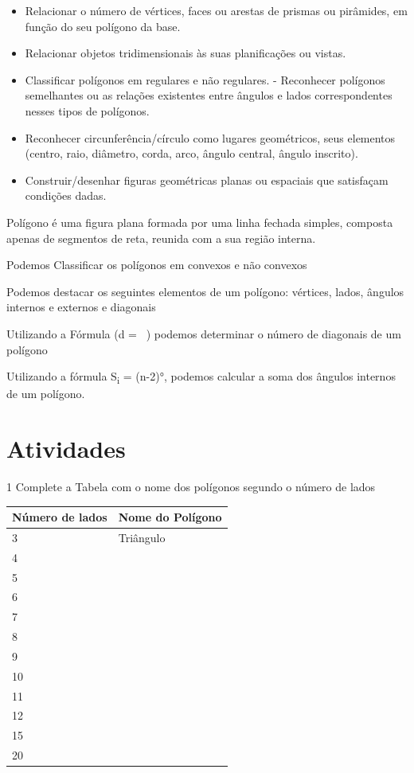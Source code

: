 \begin{itemize}

\item 
  Relacionar o número de vértices, faces ou arestas de prismas ou
  pirâmides, em função do seu polígono da base.

\item 
  Relacionar objetos tridimensionais às suas planificações ou vistas.

\item 
  Classificar polígonos em regulares e não regulares. - Reconhecer
  polígonos semelhantes ou as relações existentes entre ângulos e lados
  correspondentes nesses tipos de polígonos.

\item 
  Reconhecer circunferência/círculo como lugares geométricos, seus
  elementos (centro, raio, diâmetro, corda, arco, ângulo central, ângulo
  inscrito).

\item 
  Construir/desenhar figuras geométricas planas ou espaciais que
  satisfaçam condições dadas.
\end{itemize}

Polígono é uma figura plana formada por uma linha fechada simples,
composta apenas de segmentos de reta, reunida com a sua região interna.

Podemos Classificar os polígonos em convexos e não convexos

Podemos destacar os seguintes elementos de um polígono: vértices, lados,
ângulos internos e externos e diagonais

Utilizando a Fórmula (d = \ ) podemos determinar o
número de diagonais de um polígono

Utilizando a fórmula S\textsubscript{i} = (n-2)°, podemos
calcular a soma dos ângulos internos de um polígono.

\section{Atividades}

\num{1} Complete a Tabela com o nome dos polígonos segundo o número de lados

\begin{longtable}[]{@{}ll@{}}
\toprule
Número de lados & Nome do Polígono\tabularnewline
\midrule
\endhead
3 & Triângulo\tabularnewline
4 & ~\tabularnewline
5 & ~\tabularnewline
6 & ~\tabularnewline
7 & ~\tabularnewline
8 & ~\tabularnewline
9 & ~\tabularnewline
10 & ~\tabularnewline
11 & ~\tabularnewline
12 & ~\tabularnewline
15 & ~\tabularnewline
20 & ~\tabularnewline
\bottomrule
\end{longtable}


